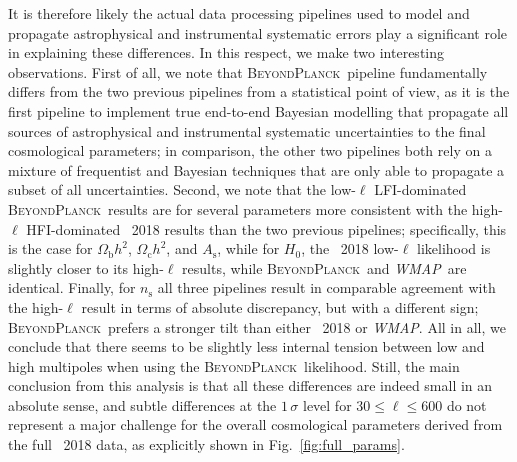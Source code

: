 \documentclass[onecolumn]{aa}
\def\WMAP{\textit{WMAP}}
\newcommand{\BP}{\textsc{BeyondPlanck}}
\begin{document}
It is therefore likely the actual data processing pipelines used to
model and propagate astrophysical and instrumental systematic errors
play a significant role in explaining these differences. In this
respect, we make two interesting observations. First of all, we note
that \BP\ pipeline fundamentally differs from the two previous
pipelines from a statistical point of view, as it is the first
pipeline to implement true end-to-end Bayesian modelling that
propagate all sources of astrophysical and instrumental systematic
uncertainties to the final cosmological parameters; in comparison, the
other two pipelines both rely on a mixture of frequentist and Bayesian
techniques that are only able to propagate a subset of all
uncertainties. Second, we note that the low-$\ell$ LFI-dominated
\BP\ results are for several parameters more consistent with the
high-$\ell$ HFI-dominated \Planck\ 2018 results than the two previous
pipelines; specifically, this is the case for $\Omega_\mathrm{b}h^2$,
$\Omega_\mathrm{c}h^2$, and $A_{\mathrm{s}}$, while for $H_0$, the
\Planck\ 2018 low-$\ell$ likelihood is slightly closer to its
high-$\ell$ results, while \BP\ and \WMAP\ are identical. Finally, for
$n_\mathrm{s}$ all three pipelines result in comparable agreement with
the high-$\ell$ result in terms of absolute discrepancy, but with a
different sign; \BP\ prefers a stronger tilt than either \Planck\ 2018
or \WMAP. All in all, we conclude that there seems to be slightly less
internal tension between low and high multipoles when using the
\BP\ likelihood. Still, the main conclusion from this analysis is that
all these differences are indeed small in an absolute sense, and
subtle differences at the $1\,\sigma$ level for $30\le\ell\le 600$ do
not represent a major challenge for the overall cosmological
parameters derived from the full \Planck\ 2018 data, as explicitly
shown in Fig.~\ref{fig:full_params}.
\end{document}
